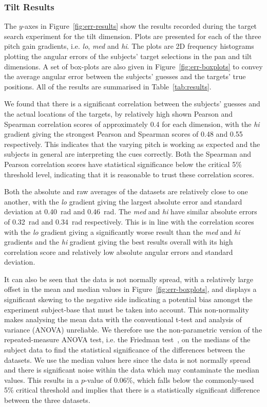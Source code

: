 \documentclass[format=sigconf, review=true, screen=true, anonymous=true]{acmart}
\begin{document}
\subsubsection{Tilt Results}

The $y$-axes in Figure~\ref{fig:err-results} show the results recorded during the target search experiment for the tilt dimension. Plots are presented for each of the three pitch gain gradients, i.e. \emph{lo}, \emph{med} and \emph{hi}. The plots are 2D frequency histograms plotting the angular errors of the subjects' target selections in the pan and tilt dimensions. A set of box-plots are also given in Figure~\ref{fig:err-boxplots} to convey the average angular error between the subjects' guesses and the targets' true positions. All of the results are summarised in Table~\ref{tab:results}.

We found that there is a significant correlation between the subjects' guesses and the actual locations of the targets, by relatively high shown Pearson and Spearman correlation scores of approximately 0.4 for each dimension, with the \emph{hi} gradient giving the strongest Pearson and Spearman scores of 0.48 and 0.55 respectively. This indicates that the varying pitch is working as expected and the subjects in general are interpreting the cues correctly. Both the Spearman and Pearson correlation scores have statistical significance below the critical 5\% threshold level, indicating that it is reasonable to trust these correlation scores. 

Both the absolute and raw averages of the datasets are relatively close to one another, with the \emph{lo} gradient giving the largest absolute error and standard deviation at \SI{0.40}{\radian} and \SI{0.46}{\radian}. The \emph{med} and \emph{hi} have similar absolute errors of \SI{0.32}{\radian} and \SI{0.34}{\radian} respectively. This is in line with the correlation scores with the \emph{lo} gradient giving a significantly worse result than the \emph{med} and \emph{hi} gradients and the \emph{hi} gradient giving the best results overall with its high correlation score and relatively low absolute angular errors and standard deviation. 

It can also be seen that the data is not normally spread, with a relatively large offset in the mean and median values in Figure~\ref{fig:err-boxplots}, and displays a significant skewing to the negative side indicating a potential bias amongst the experiment subject-base that must be taken into account. This non-normality makes analysing the mean data with the conventional t-test and analysis of variance (ANOVA) unreliable. We therefore use the non-parametric version of the repeated-measure ANOVA test, i.e. the Friedman test~\cite{friedman1937use}, on the medians of the subject data to find the statistical significance of the differences between the datasets. We use the median values here since the data is not normally spread and there is significant noise within the data which may contaminate the median values. This results in a $p$-value of 0.06\%, which falls below the commonly-used 5\% critical threshold and implies that there is a statistically significant difference between the three datasets.  
\end{document}
